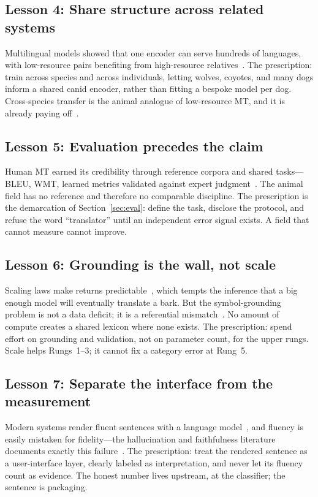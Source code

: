\subsection{Lesson 4: Share structure across related systems}
Multilingual models showed that one encoder can serve hundreds of languages,
with low-resource pairs benefiting from high-resource
relatives~\cite{johnson2017multilingual,costajussa2022nllb,fan2021beyond}. The
prescription: train across species and across individuals, letting wolves,
coyotes, and many dogs inform a shared canid encoder, rather than fitting a
bespoke model per dog. Cross-species transfer is the animal analogue of
low-resource MT, and it is already paying off~\cite{ghani2023perch,babu2022xlsr}.

\subsection{Lesson 5: Evaluation precedes the claim}
Human MT earned its credibility through reference corpora and shared
tasks---BLEU, WMT, learned metrics validated against expert
judgment~\cite{papineni2002bleu,bojar2018wmt,rei2020comet,freitag2021experts}.
The animal field has no reference and therefore no comparable discipline. The
prescription is the demarcation of Section~\ref{sec:eval}: define the task,
disclose the protocol, and refuse the word ``translator'' until an independent
error signal exists. A field that cannot measure cannot improve.

\subsection{Lesson 6: Grounding is the wall, not scale}
Scaling laws make returns predictable~\cite{kaplan2020scaling,hoffmann2022chinchilla},
which tempts the inference that a big enough model will eventually translate a
bark. But the symbol-grounding problem is not a data deficit; it is a
referential mismatch~\cite{harnad1990grounding,bisk2020experience}. No amount
of compute creates a shared lexicon where none exists. The prescription:
spend effort on grounding and validation, not on parameter count, for the
upper rungs. Scale helps Rungs~1--3; it cannot fix a category error at
Rung~5.

\subsection{Lesson 7: Separate the interface from the measurement}
Modern systems render fluent sentences with a language
model~\cite{brown2020gpt3,ouyang2022instruct}, and fluency is easily mistaken
for fidelity---the hallucination and faithfulness literature documents exactly
this failure~\cite{ji2023hallucination,maynez2020faithfulness}. The
prescription: treat the rendered sentence as a user-interface layer, clearly
labeled as interpretation, and never let its fluency count as evidence. The
honest number lives upstream, at the classifier; the sentence is packaging.

